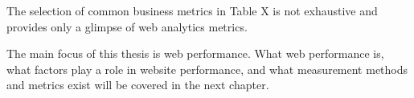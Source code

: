 


















The selection of common business metrics in Table X is not exhaustive and provides only a glimpse of web analytics metrics.

The main focus of this thesis is web performance.
What web performance is, what factors play a role in website performance, and what measurement methods and metrics exist will be covered in the next chapter.


